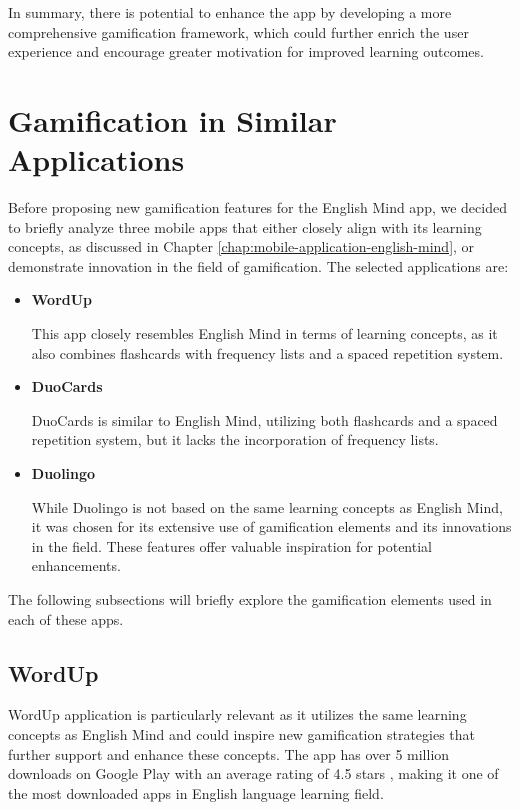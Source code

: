 In summary, there is potential to enhance the app by developing a more comprehensive gamification framework, which could further enrich the user experience and encourage greater motivation for improved learning outcomes.

\section{Gamification in Similar Applications}

Before proposing new gamification features for the English Mind app, we decided to briefly analyze three mobile apps that either closely align with its learning concepts, as discussed in Chapter \ref{chap:mobile-application-english-mind}, or demonstrate innovation in the field of gamification. The selected applications are: 

\begin{itemize}
    \item \textbf{WordUp} \cite{cite:wordup}

    This app closely resembles English Mind in terms of learning concepts, as it also combines flashcards with frequency lists and a spaced repetition system.

    \item \textbf{DuoCards} \cite{cite:duocards}

    DuoCards is similar to English Mind, utilizing both flashcards and a spaced repetition system, but it lacks the incorporation of frequency lists.

    \item \textbf{Duolingo} \cite{cite:duolingo}

    While Duolingo is not based on the same learning concepts as English Mind, it was chosen for its extensive use of gamification elements and its innovations in the field. These features offer valuable inspiration for potential enhancements.
    
\end{itemize}

The following subsections will briefly explore the gamification elements used in each of these apps.

\subsection{WordUp}

WordUp application is particularly relevant as it utilizes the same learning concepts as English Mind and could inspire new gamification strategies that further support and enhance these concepts. The app has over 5 million downloads on Google Play with an average rating of 4.5 stars \cite{cite:wordup_google_play}, making it one of the most downloaded apps in English language learning field.


